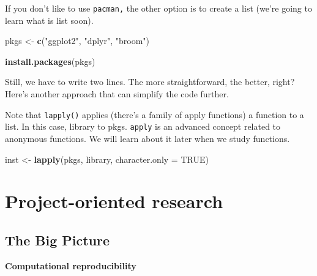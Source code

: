 \documentclass[
]{book}
\newenvironment{Shaded}{\begin{snugshade}}{\end{snugshade}}
\newcommand{\AttributeTok}[1]{\textcolor[rgb]{0.13,0.29,0.53}{#1}}
\newcommand{\ConstantTok}[1]{\textcolor[rgb]{0.56,0.35,0.01}{#1}}
\newcommand{\FunctionTok}[1]{\textcolor[rgb]{0.13,0.29,0.53}{\textbf{#1}}}
\newcommand{\NormalTok}[1]{#1}
\newcommand{\OtherTok}[1]{\textcolor[rgb]{0.56,0.35,0.01}{#1}}
\newcommand{\StringTok}[1]{\textcolor[rgb]{0.31,0.60,0.02}{#1}}
\begin{document}
If you don't like to use \texttt{pacman,} the other option is to create a list (we're going to learn what is list soon).

\begin{Shaded}
\begin{Highlighting}[]
\NormalTok{pkgs }\OtherTok{\textless{}{-}} \FunctionTok{c}\NormalTok{(}\StringTok{"ggplot2"}\NormalTok{, }\StringTok{"dplyr"}\NormalTok{, }\StringTok{"broom"}\NormalTok{)}

\FunctionTok{install.packages}\NormalTok{(pkgs)}
\end{Highlighting}
\end{Shaded}

Still, we have to write two lines. The more straightforward, the better, right? Here's another approach that can simplify the code further.

Note that \texttt{lapply()} applies (there's a family of apply functions) a function to a list. In this case, library to pkgs. \texttt{apply} is an advanced concept related to anonymous functions. We will learn about it later when we study functions.

\begin{Shaded}
\begin{Highlighting}[]
\NormalTok{inst }\OtherTok{\textless{}{-}} \FunctionTok{lapply}\NormalTok{(pkgs, library,}
               \AttributeTok{character.only =} \ConstantTok{TRUE}\NormalTok{)}
\end{Highlighting}
\end{Shaded}

\section{Project-oriented research}\label{project-oriented-research}

\subsection{The Big Picture}\label{the-big-picture-3}

\textbf{Computational reproducibility}
\end{document}
